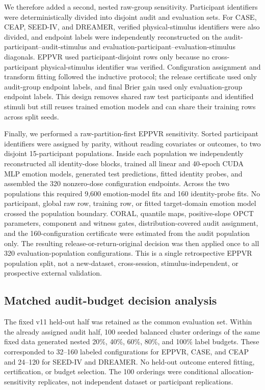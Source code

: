 \documentclass[preprint,12pt]{elsarticle}
\begin{document}
We therefore added a second, nested raw-group sensitivity. Participant identifiers were deterministically divided into disjoint audit and evaluation sets. For CASE, CEAP, SEED-IV, and DREAMER, verified physical-stimulus identifiers were also divided, and endpoint labels were independently reconstructed on the audit-participant--audit-stimulus and evaluation-participant--evaluation-stimulus diagonals. EPPVR used participant-disjoint rows only because no cross-participant physical-stimulus identifier was verified. Configuration assignment and transform fitting followed the inductive protocol; the release certificate used only audit-group endpoint labels, and final Brier gain used only evaluation-group endpoint labels. This design removes shared raw test participants and identified stimuli but still reuses trained emotion models and can share their training rows across split seeds.

Finally, we performed a raw-partition-first EPPVR sensitivity. Sorted participant identifiers were assigned by parity, without reading covariates or outcomes, to two disjoint 15-participant populations. Inside each population we independently reconstructed all identity-dose blocks, trained all linear and 40-epoch CUDA MLP emotion models, generated test predictions, fitted identity probes, and assembled the 320 nonzero-dose configuration endpoints. Across the two populations this required 9,600 emotion-model fits and 160 identity-probe fits. No participant, global raw row, training row, or fitted target-domain emotion model crossed the population boundary. CORAL, quantile maps, positive-slope OPCT parameters, component and witness gates, distribution-covered audit assignment, and the 160-configuration certificate were estimated from the audit population only. The resulting release-or-return-original decision was then applied once to all 320 evaluation-population configurations. This is a single retrospective EPPVR population split, not a new-dataset, cross-session, stimulus-independent, or prospective external validation.

\subsection{Matched audit-budget decision analysis}
\label{subsec:budget}

The fixed v11 held-out half was retained as the common evaluation set. Within the already assigned audit half, 100 seeded balanced cluster orderings of the same fixed data generated nested 20\%, 40\%, 60\%, 80\%, and 100\% label budgets. These corresponded to 32--160 labeled configurations for EPPVR, CASE, and CEAP and 24--120 for SEED-IV and DREAMER. No held-out outcome entered fitting, certification, or budget selection. The 100 orderings were conditional allocation-sensitivity replicates, not independent dataset or participant replications.
\end{document}
